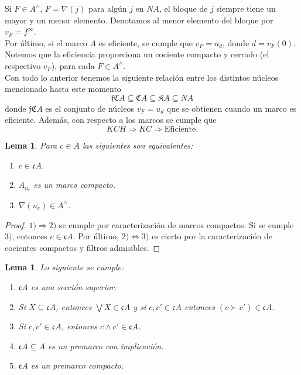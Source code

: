 \documentclass[11pt]{amsart}
\theoremstyle{plain}
\newtheorem{lem}[thm]{Lema}
\theoremstyle{definition}
\begin{document}
Si $F\in A^\wedge$, $F=\nabla(j)$ para algún $j$ en $NA$, el bloque de $j$ siempre tiene un mayor y un menor elemento. Denotamos al menor elemento del bloque por  $v_F=f^\infty$.\\

Por último, si el marco $A$ es eficiente, se cumple que $v_F=u_d$, donde $d=v_F(0)$. Notemos que la eficiencia proporciona un cociente compacto y cerrado (el respectivo $v_F$), 
para cada $F\in A^\wedge$.\\

Con todo lo anterior tenemos la siguiente relación entre los distintos núcleos mencionado hasta este momento
\[
\mathfrak{f}\mathfrak{C}A\subseteq \mathfrak{C}A\subseteq \mathfrak{K}A\subseteq NA
\]
donde $\mathfrak{f}\mathfrak{C}A$ es el conjunto de núcleos $v_F=u_d$ que se obtienen cuando un marco es eficiente. Además, con respecto a los marcos se cumple que
\[
KCH\Rightarrow KC\Rightarrow \mbox{Eficiente}.
\]

\begin{lem}\label{Lema2.2}
    Para $c\in A$ las siguientes son equivalentes:
    \begin{enumerate}
        \item $c\in \mathfrak{c}A$.
        \item $A_{u_c}$ es un marco compacto.
        \item $\nabla(u_c)\in A^\wedge$.
    \end{enumerate}
\end{lem}

\begin{proof}
    $1)\Rightarrow 2)$ se cumple por caracterización de marcos compactos. Si se cumple $3)$, entonces $c\in \mathfrak{c}A$. Por último, $2) \Leftrightarrow 3)$ es cierto por la caracterización de cocientes compactos y filtros admisibles. 
\end{proof}

\begin{lem}\label{Lema2.3}
    Lo siguiente se cumple:
    \begin{enumerate}
        \item $\mathfrak{c}A$ es una sección superior.
        \item Si $X\subseteq \mathfrak{c}A$, entonces $\bigvee X\in \mathfrak{c}A$ y si $c, c'\in \mathfrak{c}A$ entonces $(c\succ c')\in \mathfrak{c}A$.
        \item Si $c, c'\in \mathfrak{c}A$, entonces $c\wedge c'\in \mathfrak{c}A$.
        \item $\mathfrak{c}A\subseteq A$ es un premarco con implicación.
        \item $\mathfrak{c}A$ es un premarco compacto.
    \end{enumerate}
\end{lem}
\end{document}
